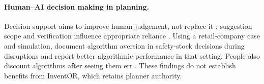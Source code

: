 \documentclass[preprint,12pt,nonatbib]{elsarticle}
\let\cite\parencite
\begin{document}
\paragraph{Human--AI decision making in planning.}
Decision support aims to improve human judgement, not replace it \cite{gorry1971framework, sprague1980framework, shim2002past}; suggestion scope and verification influence appropriate reliance \cite{parasuraman2000model, parasuraman2010complacency}. Using a retail-company case and simulation, \textcite{wang2024aversion} document algorithm aversion in safety-stock decisions during disruptions and report better algorithmic performance in that setting. People also discount algorithms after seeing them err \cite{dietvorst2015aversion}. These findings do not establish benefits from InventOR, which retains planner authority.
\end{document}
